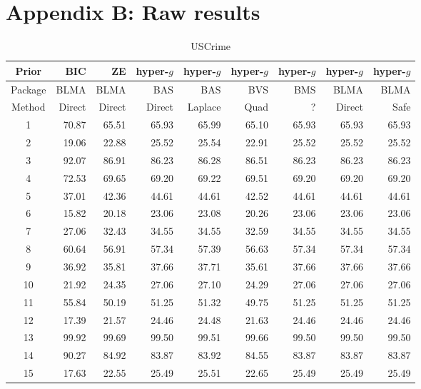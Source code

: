 \documentclass{article}[12pt]
\begin{document}
\newpage 
 
\section*{Appendix B: Raw results}


\begin{table}[ht]
	\centering
	{\small 
	\begin{tabular}{c|r|r|rrrrrr}
		Prior   & BIC    & ZE     & hyper-$g$ & hyper-$g$ & hyper-$g$  & hyper-$g$ & hyper-$g$ & hyper-$g$ \\
		\hline 
		Package & BLMA   & BLMA   & BAS       & BAS       & BVS        & BMS       & BLMA      & BLMA       \\
		\hline 
		Method  & Direct & Direct & Direct    & Laplace   & Quad & ?         & Direct    & Safe      \\ 
		\hline
		1 & 70.87 & 65.51 & 65.93 & 65.99 & 65.10 & 65.93 & 65.93 & 65.93 \\ 
		2 & 19.06 & 22.88 & 25.52 & 25.54 & 22.91 & 25.52 & 25.52 & 25.52 \\ 
		3 & 92.07 & 86.91 & 86.23 & 86.28 & 86.51 & 86.23 & 86.23 & 86.23 \\ 
		4 & 72.53 & 69.65 & 69.20 & 69.22 & 69.51 & 69.20 & 69.20 & 69.20 \\ 
		5 & 37.01 & 42.36 & 44.61 & 44.61 & 42.52 & 44.61 & 44.61 & 44.61 \\ 
		6 & 15.82 & 20.18 & 23.06 & 23.08 & 20.26 & 23.06 & 23.06 & 23.06 \\ 
		7 & 27.06 & 32.43 & 34.55 & 34.55 & 32.59 & 34.55 & 34.55 & 34.55 \\ 
		8 & 60.64 & 56.91 & 57.34 & 57.39 & 56.63 & 57.34 & 57.34 & 57.34 \\ 
		9 & 36.92 & 35.81 & 37.66 & 37.71 & 35.61 & 37.66 & 37.66 & 37.66 \\ 
		10 & 21.92 & 24.35 & 27.06 & 27.10 & 24.29 & 27.06 & 27.06 & 27.06 \\ 
		11 & 55.84 & 50.19 & 51.25 & 51.32 & 49.75 & 51.25 & 51.25 & 51.25 \\ 
		12 & 17.39 & 21.57 & 24.46 & 24.48 & 21.63 & 24.46 & 24.46 & 24.46 \\ 
		13 & 99.92 & 99.69 & 99.50 & 99.51 & 99.66 & 99.50 & 99.50 & 99.50 \\ 
		14 & 90.27 & 84.92 & 83.87 & 83.92 & 84.55 & 83.87 & 83.87 & 83.87 \\ 
		15 & 17.63 & 22.55 & 25.49 & 25.51 & 22.65 & 25.49 & 25.49 & 25.49  \\ 
		\hline
	\end{tabular}
}
	\caption{USCrime}
	\label{tab:USCrimeResults1}
\end{table}
\end{document}

